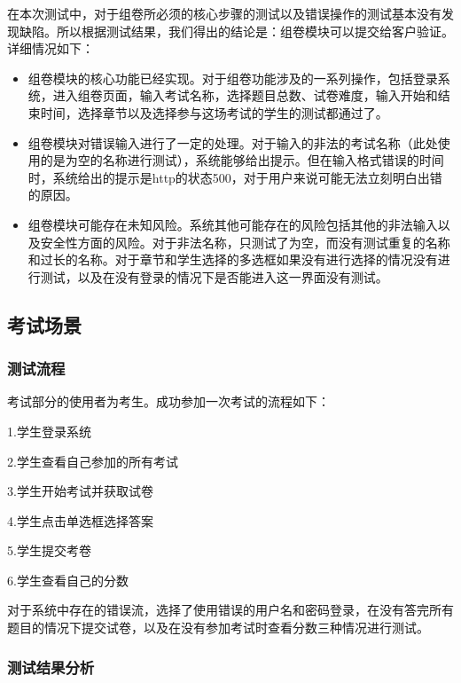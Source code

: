 \documentclass[hyperref, a4paper]{ctexart}
\begin{document}
在本次测试中，对于组卷所必须的核心步骤的测试以及错误操作的测试基本没有发现缺陷。所以根据测试结果，我们得出的结论是：组卷模块可以提交给客户验证。详细情况如下：

\begin{itemize}
\item
  组卷模块的核心功能已经实现。对于组卷功能涉及的一系列操作，包括登录系统，进入组卷页面，输入考试名称，选择题目总数、试卷难度，输入开始和结束时间，选择章节以及选择参与这场考试的学生的测试都通过了。
\item
  组卷模块对错误输入进行了一定的处理。对于输入的非法的考试名称（此处使用的是为空的名称进行测试），系统能够给出提示。但在输入格式错误的时间时，系统给出的提示是http的状态500，对于用户来说可能无法立刻明白出错的原因。
\item
  组卷模块可能存在未知风险。系统其他可能存在的风险包括其他的非法输入以及安全性方面的风险。对于非法名称，只测试了为空，而没有测试重复的名称和过长的名称。对于章节和学生选择的多选框如果没有进行选择的情况没有进行测试，以及在没有登录的情况下是否能进入这一界面没有测试。
\end{itemize}

\hypertarget{ux8003ux8bd5ux573aux666f}{%
\subsection{考试场景}\label{ux8003ux8bd5ux573aux666f}}

\hypertarget{ux6d4bux8bd5ux6d41ux7a0b-2}{%
\subsubsection{测试流程}\label{ux6d4bux8bd5ux6d41ux7a0b-2}}

考试部分的使用者为考生。成功参加一次考试的流程如下：

1.学生登录系统

2.学生查看自己参加的所有考试

3.学生开始考试并获取试卷

4.学生点击单选框选择答案

5.学生提交考卷

6.学生查看自己的分数

对于系统中存在的错误流，选择了使用错误的用户名和密码登录，在没有答完所有题目的情况下提交试卷，以及在没有参加考试时查看分数三种情况进行测试。

\hypertarget{ux6d4bux8bd5ux7ed3ux679cux5206ux6790-2}{%
\subsubsection{测试结果分析}\label{ux6d4bux8bd5ux7ed3ux679cux5206ux6790-2}}
\end{document}
